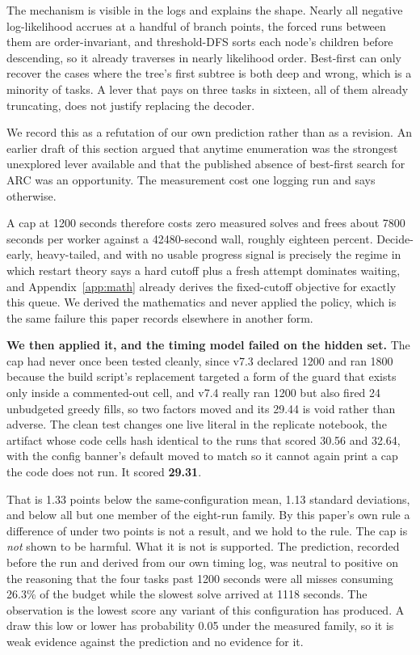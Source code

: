 \documentclass[11pt]{article}
\begin{document}
The mechanism is visible in the logs and explains the shape. Nearly all negative log-likelihood
accrues at a handful of branch points, the forced runs between them are order-invariant, and
threshold-DFS sorts each node's children before descending, so it already traverses in nearly
likelihood order. Best-first can only recover the cases where the tree's first subtree is both deep
and wrong, which is a minority of tasks. A lever that pays on three tasks in sixteen, all of them
already truncating, does not justify replacing the decoder.

We record this as a refutation of our own prediction rather than as a revision. An earlier draft of
this section argued that anytime enumeration was the strongest unexplored lever available and that
the published absence of best-first search for ARC was an opportunity. The measurement cost one
logging run and says otherwise.

A cap at 1200 seconds therefore costs zero measured solves and frees about 7800 seconds per worker
against a 42480-second wall, roughly eighteen percent. Decide-early, heavy-tailed, and with no usable
progress signal is precisely the regime in which restart theory says a hard cutoff plus a fresh attempt
dominates waiting, and Appendix~\ref{app:math} already derives the fixed-cutoff objective for exactly
this queue. We derived the mathematics and never applied the policy, which is the same failure this
paper records elsewhere in another form.

\textbf{We then applied it, and the timing model failed on the hidden set.} The
cap had never once been tested cleanly, since v7.3 declared 1200 and ran 1800 because the build script's
replacement targeted a form of the guard that exists only inside a commented-out cell, and v7.4
really ran 1200 but also fired 24 unbudgeted greedy fills, so two factors moved and its 29.44 is
void rather than adverse. The clean test changes one live literal in the replicate notebook, the
artifact whose code cells hash identical to the runs that scored 30.56 and 32.64, with the config
banner's default moved to match so it cannot again print a cap the code does not run. It scored
\textbf{29.31}.

That is 1.33 points below the same-configuration mean, 1.13 standard deviations, and below all but
one member of the eight-run family. By this paper's own rule a difference of under two points is not a
result, and we hold to the rule. The cap is \emph{not} shown to be harmful. What it is not is
supported. The prediction, recorded before the run and derived from our own timing log, was neutral
to positive on the reasoning that the four tasks past 1200 seconds were all misses consuming 26.3\%
of the budget while the slowest solve arrived at 1118 seconds. The observation is the lowest score
any variant of this configuration has produced. A draw this low or lower has probability 0.05 under
the measured family, so it is weak evidence against the prediction and no evidence for it.
\end{document}
